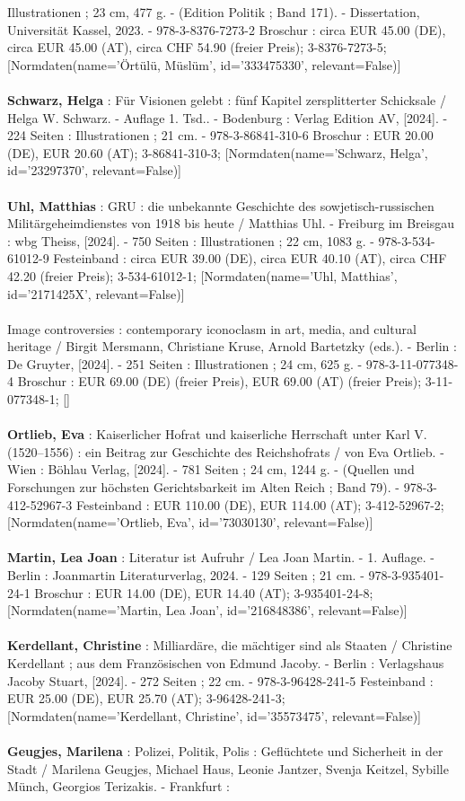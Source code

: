 \documentclass{article}
\begin{document}
\begin{multicols}{3}
Illustrationen ; 23 cm, 477 g. - (Edition Politik ; Band 171). - Dissertation, Universität Kassel, 2023. - 978-3-8376-7273-2 Broschur : circa EUR 45.00 (DE), circa EUR 45.00 (AT), circa CHF 54.90 (freier Preis); 3-8376-7273-5; [Normdaten(name='Örtülü, Müslüm', id='333475330', relevant=False)]\\\\\textbf{Schwarz, Helga} : Für Visionen gelebt : fünf Kapitel zersplitterter Schicksale / Helga W. Schwarz. - Auflage 1. Tsd.. - Bodenburg : Verlag Edition AV, [2024]. - 224 Seiten : Illustrationen ; 21 cm. - 978-3-86841-310-6 Broschur : EUR 20.00 (DE), EUR 20.60 (AT); 3-86841-310-3; [Normdaten(name='Schwarz, Helga', id='23297370', relevant=False)]\\\\\textbf{Uhl, Matthias} : GRU : die unbekannte Geschichte des sowjetisch-russischen Militärgeheimdienstes von 1918 bis heute / Matthias Uhl. - Freiburg im Breisgau : wbg Theiss, [2024]. - 750 Seiten : Illustrationen ; 22 cm, 1083 g. - 978-3-534-61012-9 Festeinband : circa EUR 39.00 (DE), circa EUR 40.10 (AT), circa CHF 42.20 (freier Preis); 3-534-61012-1; [Normdaten(name='Uhl, Matthias', id='2171425X', relevant=False)]\\\\Image controversies : contemporary iconoclasm in art, media, and cultural heritage / Birgit Mersmann, Christiane Kruse, Arnold Bartetzky (eds.). - Berlin : De Gruyter, [2024]. - 251 Seiten : Illustrationen ; 24 cm, 625 g. - 978-3-11-077348-4 Broschur : EUR 69.00 (DE) (freier Preis), EUR 69.00 (AT) (freier Preis); 3-11-077348-1; []\\\\\textbf{Ortlieb, Eva} : Kaiserlicher Hofrat und kaiserliche Herrschaft unter Karl V. (1520–1556) : ein Beitrag zur Geschichte des Reichshofrats / von Eva Ortlieb. - Wien : Böhlau Verlag, [2024]. - 781 Seiten ; 24 cm, 1244 g. - (Quellen und Forschungen zur höchsten Gerichtsbarkeit im Alten Reich ; Band 79). - 978-3-412-52967-3 Festeinband : EUR 110.00 (DE), EUR 114.00 (AT); 3-412-52967-2; [Normdaten(name='Ortlieb, Eva', id='73030130', relevant=False)]\\\\\textbf{Martin, Lea Joan} : Literatur ist Aufruhr / Lea Joan Martin. - 1. Auflage. - Berlin : Joanmartin Literaturverlag, 2024. - 129 Seiten ; 21 cm. - 978-3-935401-24-1 Broschur : EUR 14.00 (DE), EUR 14.40 (AT); 3-935401-24-8; [Normdaten(name='Martin, Lea Joan', id='216848386', relevant=False)]\\\\\textbf{Kerdellant, Christine} : Milliardäre, die mächtiger sind als Staaten / Christine Kerdellant ; aus dem Französischen von Edmund Jacoby. - Berlin : Verlagshaus Jacoby Stuart, [2024]. - 272 Seiten ; 22 cm. - 978-3-96428-241-5 Festeinband : EUR 25.00 (DE), EUR 25.70 (AT); 3-96428-241-3; [Normdaten(name='Kerdellant, Christine', id='35573475', relevant=False)]\\\\\textbf{Geugjes, Marilena} : Polizei, Politik, Polis : Geflüchtete und Sicherheit in der Stadt / Marilena Geugjes, Michael Haus, Leonie Jantzer, Svenja Keitzel, Sybille Münch, Georgios Terizakis. - Frankfurt : 
\end{multicols}
\end{document}
